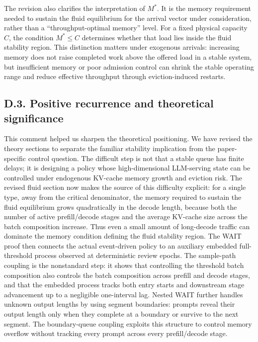 \vspace{0.25em}
\noindent The revision also clarifies the interpretation of \(M^*\). It is the memory requirement needed to sustain the fluid equilibrium for the arrival vector under consideration, rather than a ``throughput-optimal memory'' level. For a fixed physical capacity \(C\), the condition \(M^*\le C\) determines whether that load lies inside the fluid stability region. This distinction matters under exogenous arrivals: increasing memory does not raise completed work above the offered load in a stable system, but insufficient memory or poor admission control can shrink the stable operating range and reduce effective throughput through eviction-induced restarts.

\subsection*{D.3. Positive recurrence and theoretical significance}


\response This comment helped us sharpen the theoretical positioning. We have revised the theory sections to separate the familiar stability implication from the paper-specific control question. The difficult step is not that a stable queue has finite delays; it is designing a policy whose high-dimensional LLM-serving state can be controlled under endogenous KV-cache memory growth and eviction risk. The revised fluid section now makes the source of this difficulty explicit: for a single type, away from the critical denominator, the memory required to sustain the fluid equilibrium grows quadratically in the decode length, because both the number of active prefill/decode stages and the average KV-cache size across the batch composition increase. Thus even a small amount of long-decode traffic can dominate the memory condition defining the fluid stability region. The WAIT proof then connects the actual event-driven policy to an auxiliary embedded full-threshold process observed at deterministic review epochs. The sample-path coupling is the nonstandard step: it shows that controlling the threshold batch composition also controls the batch composition across prefill and decode stages, and that the embedded process tracks both entry starts and downstream stage advancement up to a negligible one-interval lag. Nested WAIT further handles unknown output lengths by using segment boundaries: prompts reveal their output length only when they complete at a boundary or survive to the next segment. The boundary-queue coupling exploits this structure to control memory overflow without tracking every prompt across every prefill/decode stage.

